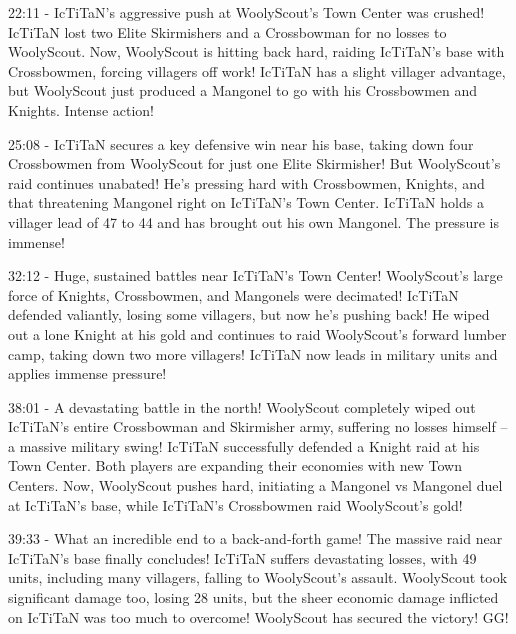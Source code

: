 22:11 - IcTiTaN's aggressive push at WoolyScout's Town Center was crushed! IcTiTaN lost two Elite Skirmishers and a Crossbowman for no losses to WoolyScout. Now, WoolyScout is hitting back hard, raiding IcTiTaN's base with Crossbowmen, forcing villagers off work! IcTiTaN has a slight villager advantage, but WoolyScout just produced a Mangonel to go with his Crossbowmen and Knights. Intense action! \par \vspace{1em}

25:08 - IcTiTaN secures a key defensive win near his base, taking down four Crossbowmen from WoolyScout for just one Elite Skirmisher! But WoolyScout's raid continues unabated! He's pressing hard with Crossbowmen, Knights, and that threatening Mangonel right on IcTiTaN's Town Center. IcTiTaN holds a villager lead of 47 to 44 and has brought out his own Mangonel. The pressure is immense! \par \vspace{1em}

32:12 - Huge, sustained battles near IcTiTaN's Town Center! WoolyScout's large force of Knights, Crossbowmen, and Mangonels were decimated! IcTiTaN defended valiantly, losing some villagers, but now he's pushing back! He wiped out a lone Knight at his gold and continues to raid WoolyScout's forward lumber camp, taking down two more villagers! IcTiTaN now leads in military units and applies immense pressure! \par \vspace{1em}

38:01 - A devastating battle in the north! WoolyScout completely wiped out IcTiTaN's entire Crossbowman and Skirmisher army, suffering no losses himself – a massive military swing! IcTiTaN successfully defended a Knight raid at his Town Center. Both players are expanding their economies with new Town Centers. Now, WoolyScout pushes hard, initiating a Mangonel vs Mangonel duel at IcTiTaN's base, while IcTiTaN's Crossbowmen raid WoolyScout's gold! \par \vspace{1em}

39:33 - What an incredible end to a back-and-forth game! The massive raid near IcTiTaN's base finally concludes! IcTiTaN suffers devastating losses, with 49 units, including many villagers, falling to WoolyScout's assault. WoolyScout took significant damage too, losing 28 units, but the sheer economic damage inflicted on IcTiTaN was too much to overcome! WoolyScout has secured the victory! GG! \par \vspace{1em}

